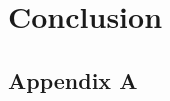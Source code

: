 \documentclass[UKenglish]{book}
\begin{document}
\chapter*{Conclusion}\label{chap:conclusion}

\backmatter{}

\begin{appendices}

\appendix
\chapter{Appendix A}
\renewcommand{\thechapter}{A}
\renewcommand{\theequation}{\thechapter.\arabic{equation}}



% 
%
% 
%
% 


\end{appendices}





\end{document}
